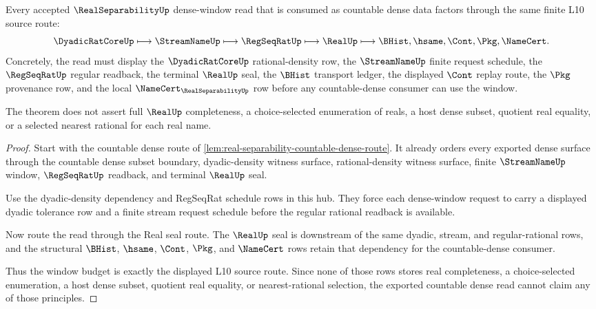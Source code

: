 \begin{theorem}
\label{thm:real-separability-countable-dense-window-budget}
Every accepted $\RealSeparabilityUp$ dense-window read that is consumed as countable dense data factors through the same finite L10 source route:
$$
\DyadicRatCoreUp \longmapsto \StreamNameUp \longmapsto \RegSeqRatUp \longmapsto \RealUp \longmapsto \BHist,\hsame,\Cont,\Pkg,\NameCert .
$$
Concretely, the read must display the $\DyadicRatCoreUp$ rational-density row, the $\StreamNameUp$ finite request schedule, the $\RegSeqRatUp$ regular readback, the terminal $\RealUp$ seal, the $\BHist$ transport ledger, the displayed $\Cont$ replay route, the $\Pkg$ provenance row, and the local $\NameCert_{\RealSeparabilityUp}$ row before any countable-dense consumer can use the window.

The theorem does not assert full $\RealUp$ completeness, a choice-selected enumeration of reals, a host dense subset, quotient real equality, or a selected nearest rational for each real name.
\end{theorem}
\begin{proof}
Start with the countable dense route of \autoref{lem:real-separability-countable-dense-route}. It already orders every exported dense surface through the countable dense subset boundary, dyadic-density witness surface, rational-density witness surface, finite $\StreamNameUp$ window, $\RegSeqRatUp$ readback, and terminal $\RealUp$ seal.

Use the dyadic-density dependency and RegSeqRat schedule rows in this hub. They force each dense-window request to carry a displayed dyadic tolerance row and a finite stream request schedule before the regular rational readback is available.

Now route the read through the Real seal route. The $\RealUp$ seal is downstream of the same dyadic, stream, and regular-rational rows, and the structural $\BHist$, $\hsame$, $\Cont$, $\Pkg$, and $\NameCert$ rows retain that dependency for the countable-dense consumer.

Thus the window budget is exactly the displayed L10 source route. Since none of those rows stores real completeness, a choice-selected enumeration, a host dense subset, quotient real equality, or nearest-rational selection, the exported countable dense read cannot claim any of those principles.
\end{proof}
